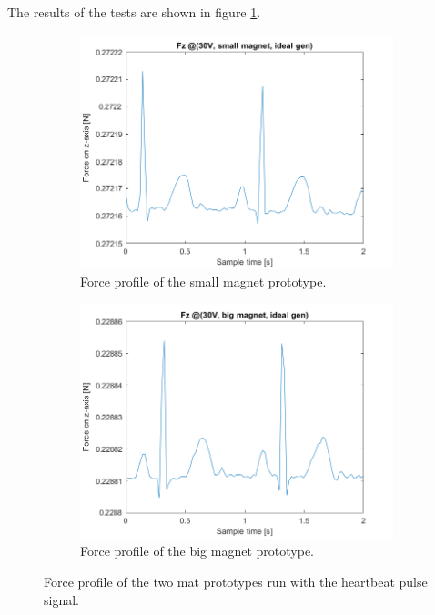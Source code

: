 \begin{samepage}
    The results of the tests are shown in figure \ref{fig: Force_vs_magnet_size}.
    \nopagebreak

    \begin{figure}[H]
        \centering
        \begin{subfigure}[b]{0.475\textwidth}
            \centering
            \includegraphics[width = 1\linewidth]{Chapters/Chapter5/Exp_Evaluation/Figures/Fz_@30V_small_magn_idealgen.png}
            \caption{Force profile of the small magnet prototype.}
        \end{subfigure}
        \begin{subfigure}[b]{0.475\textwidth}
            \centering
            \includegraphics[width = 1\linewidth]{Chapters/Chapter5/Exp_Evaluation/Figures/Fz_@30V_big_magn_idealgen.png}
            \caption{Force profile of the big magnet prototype.}
        \end{subfigure}
        \caption{Force profile of the two mat prototypes run with the heartbeat pulse signal.}
        \label{fig: Force_vs_magnet_size}
    \end{figure}
\end{samepage}


